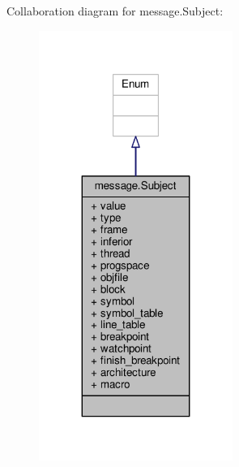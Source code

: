 Collaboration diagram for message.\+Subject\+:
\nopagebreak
\begin{figure}[H]
\begin{center}
\leavevmode
\includegraphics[width=179pt]{classmessage_1_1Subject__coll__graph}
\end{center}
\end{figure}
